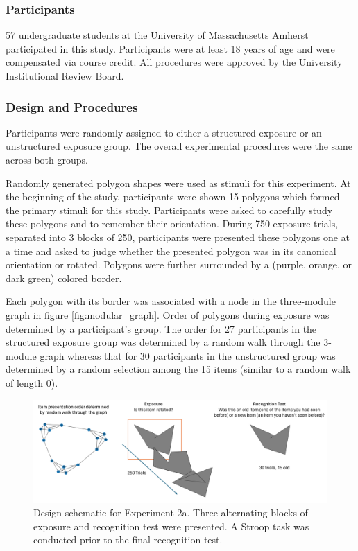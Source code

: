 \subsubsection*{Participants}
57 undergraduate students at the University of Massachusetts Amherst participated in this study. Participants were at least 18 years of age and were compensated via course credit. All procedures were approved by the University Institutional Review Board. 

\subsubsection*{Design and Procedures}
Participants were randomly assigned to either a structured exposure or an unstructured exposure group. The overall experimental procedures were the same across both groups. 

Randomly generated polygon shapes were used as stimuli for this experiment. At the beginning of the study, participants were shown 15 polygons which formed the primary stimuli for this study. Participants were asked to carefully study these polygons and to remember their orientation. During 750 exposure trials, separated into 3 blocks of 250, participants were presented these polygons one at a time and asked to judge whether the presented polygon was in its canonical orientation or rotated. Polygons were further surrounded by a (purple, orange, or dark green) colored border.

Each polygon with its border was associated with a node in the three-module graph in figure \ref{fig:modular_graph}. Order of polygons during exposure was determined by a participant's group. The order for 27 participants in the structured exposure group was determined by a random walk through the 3-module graph whereas that for 30 participants in the unstructured group was determined by a random selection among the 15 items (similar to a random walk of length 0). 

\begin{figure}[ht]
    \centering
    \includegraphics[width = \textwidth]{chapter_notebooks/chapter_3/figures/exp2_design.png}
    \caption{Design schematic for Experiment 2a. Three alternating blocks of exposure and recognition test were presented. A Stroop task was conducted prior to the final recognition test.}
    \label{fig:exp2-design}
\end{figure}

